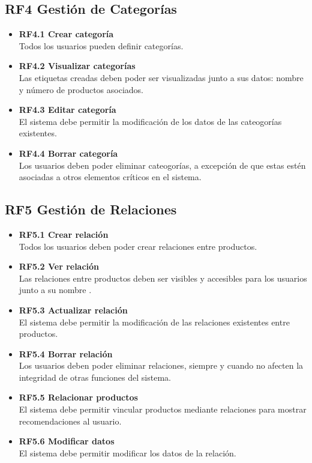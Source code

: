 \documentclass[12pt.a4paper]{article}
\begin{document}
\subsection*{RF4 Gestión de Categorías}

\begin{itemize}
    \item \textbf{RF4.1 Crear categoría} \\
    Todos los usuarios pueden definir categorías.

    \item \textbf{RF4.2 Visualizar categorías} \\
    Las etiquetas creadas deben poder ser visualizadas junto a sus datos: nombre y número de productos asociados.

    \item \textbf{RF4.3 Editar categoría} \\
    El sistema debe permitir la modificación de los datos de las cateogorías existentes.

    \item \textbf{RF4.4 Borrar categoría} \\
    Los usuarios deben poder eliminar cateogorías, a excepción de que estas estén asociadas a otros elementos críticos en el sistema.
\end{itemize}

\subsection*{RF5 Gestión de Relaciones}

\begin{itemize}
    \item \textbf{RF5.1 Crear relación} \\
    Todos los usuarios deben poder crear relaciones entre productos.

    \item \textbf{RF5.2 Ver relación} \\
    Las relaciones entre productos deben ser visibles y accesibles para los usuarios junto a su nombre .

    \item \textbf{RF5.3 Actualizar relación} \\
    El sistema debe permitir la modificación de las relaciones existentes entre productos.

    \item \textbf{RF5.4 Borrar relación} \\
    Los usuarios deben poder eliminar relaciones, siempre y cuando no afecten la integridad de otras funciones del sistema.

    \item \textbf{RF5.5 Relacionar productos} \\
    El sistema debe permitir vincular productos mediante relaciones para mostrar recomendaciones al usuario.
    
    \item \textbf{RF5.6 Modificar datos} \\
    El sistema debe permitir modificar los datos de la relación.
    
\end{itemize}
\end{document}
